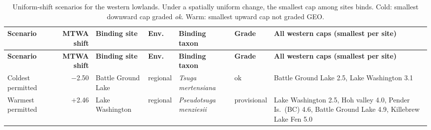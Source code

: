 {\footnotesize
\begin{longtable}{>{\raggedright\arraybackslash}p{}r>{\raggedright\arraybackslash}p{}l>{\raggedright\arraybackslash}p{}l>{\raggedright\arraybackslash}p{}}
\caption{Uniform-shift scenarios for the western lowlands. Under a spatially uniform change, the smallest cap among sites binds. Cold: smallest downward cap graded \emph{ok}. Warm: smallest upward cap not graded GEO.}\label{tab:scenarios}\\
\toprule
\textbf{Scenario} & \textbf{MTWA shift} & \textbf{Binding site} & \textbf{Env.} & \textbf{Binding taxon} & \textbf{Grade} & \textbf{All western caps (smallest per site)} \\
\midrule
\endfirsthead
\toprule
\textbf{Scenario} & \textbf{MTWA shift} & \textbf{Binding site} & \textbf{Env.} & \textbf{Binding taxon} & \textbf{Grade} & \textbf{All western caps (smallest per site)} \\
\midrule
\endhead
\bottomrule
\endfoot
Coldest permitted & $-$2.50 & Battle Ground Lake & regional & \emph{Tsuga mertensiana} & ok & Battle Ground Lake 2.5, Lake Washington 3.1 \\
Warmest permitted & $+$2.46 & Lake Washington & regional & \emph{Pseudotsuga menziesii} & provisional & Lake Washington 2.5, Hoh valley 4.0, Pender Is.\ (BC) 4.6, Battle Ground Lake 4.9, Killebrew Lake Fen 5.0 \\
\end{longtable}
}
